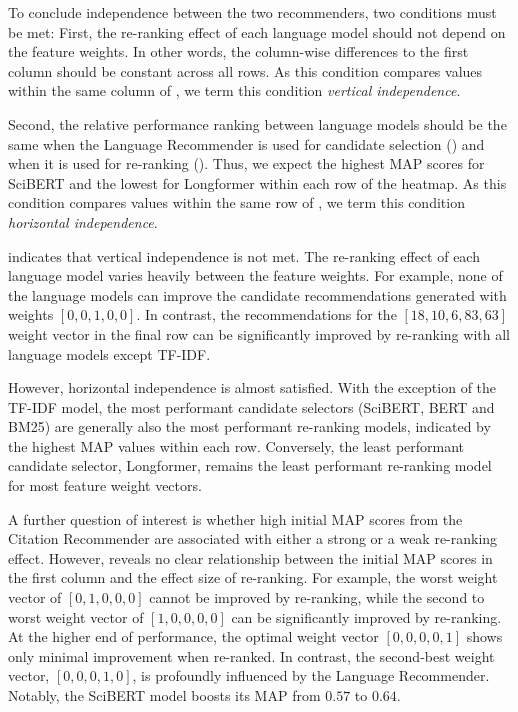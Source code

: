 To conclude independence between the two recommenders, two conditions must be met:
First, the re-ranking effect of each language model should not depend on the feature weights.
In other words, the column-wise differences to the first column should be constant across all rows.
As this condition compares values within the same column of , we term this condition \emph{vertical independence}.

Second, the relative performance ranking between language models should be the same when the Language Recommender is used for candidate selection () and when it is used for re-ranking ().
Thus, we expect the highest \ac{MAP} scores for SciBERT and the lowest for Longformer within each row of the heatmap.
As this condition compares values within the same row of , we term this condition \emph{horizontal independence}.

 indicates that vertical independence is not met. The re-ranking effect of each language model varies heavily between the feature weights. For example, none of the language models can improve the candidate recommendations generated with weights $[0,0,1,0,0]$. In contrast, the recommendations for the $[18,10,6,83,63]$ weight vector in the final row can be significantly improved by re-ranking with all language models except TF-IDF.

However, horizontal independence is almost satisfied. With the exception of the TF-IDF model, the most performant candidate selectors (SciBERT, BERT and BM25) are generally also the most performant re-ranking models, indicated by the highest \ac{MAP} values within each row. Conversely, the least performant candidate selector, Longformer, remains the least performant re-ranking model for most feature weight vectors.

A further question of interest is whether high initial \ac{MAP} scores from the Citation Recommender are associated with either a strong or a weak re-ranking effect.
However,  reveals no clear relationship between the initial \ac{MAP} scores in the first column and the effect size of re-ranking.
For example, the worst weight vector of $[0,1,0,0,0]$ cannot be improved by re-ranking, while the second to worst weight vector of $[1,0,0,0,0]$ can be significantly improved by re-ranking.
At the higher end of performance, the optimal weight vector $[0,0,0,0,1]$ shows only minimal improvement when re-ranked. In contrast, the second-best weight vector, $[0,0,0,1,0]$, is profoundly influenced by the Language Recommender. Notably, the SciBERT model boosts its \ac{MAP} from $0.57$ to $0.64$.

